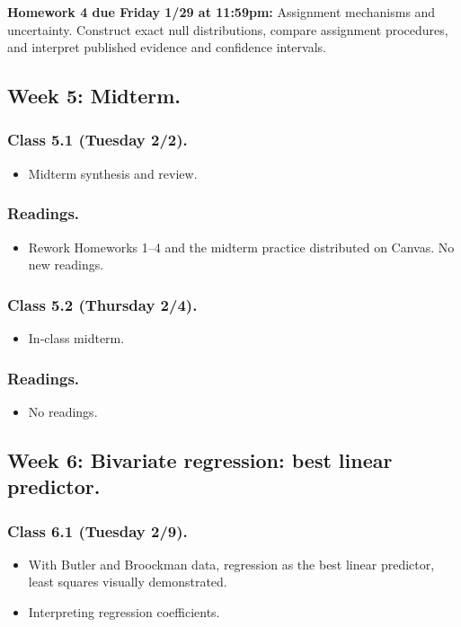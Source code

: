\documentclass[letterpaper, 12pt, parskip=full,DIV=10]{scrartcl}
\begin{document}
\textbf{Homework 4 due Friday 1/29 at 11:59pm:}
Assignment mechanisms and uncertainty. Construct exact null distributions, compare assignment procedures, and interpret published evidence and confidence intervals.

\subsection*{Week 5: Midterm.}
\subsubsection*{Class 5.1 (Tuesday 2/2).}
\begin{itemize}
\item Midterm synthesis and review.
\end{itemize}

\subsubsection*{Readings.}
\begin{itemize}
\item Rework Homeworks 1--4 and the midterm practice distributed on Canvas. No new readings.
\end{itemize}

\subsubsection*{Class 5.2 (Thursday 2/4).}
\begin{itemize}
\item In-class midterm.
\end{itemize}

\subsubsection*{Readings.}
\begin{itemize}
\item No readings.
\end{itemize}

\subsection*{Week 6: Bivariate regression: best linear predictor.}
\subsubsection*{Class 6.1 (Tuesday 2/9).}
\begin{itemize}
\item With Butler and Broockman data, regression as the best linear predictor, least squares visually demonstrated.
\item Interpreting regression coefficients.
\end{itemize}
\end{document}
